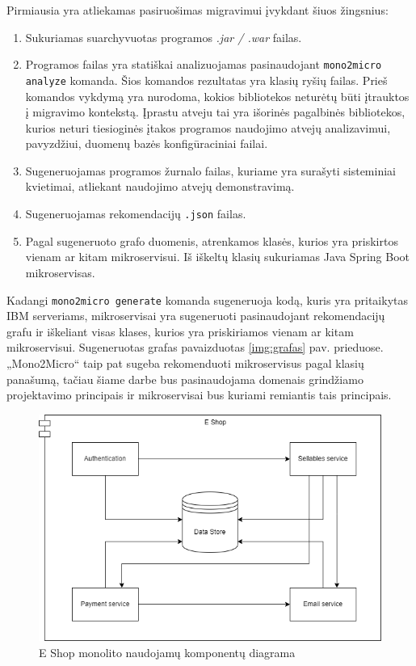 \documentclass{VUMIFPSbakalaurinis}
\begin{document}
Pirmiausia yra atliekamas pasiruošimas migravimui įvykdant šiuos žingsnius:
\begin{enumerate}
    \item Sukuriamas suarchyvuotas programos \emph{.jar / .war} failas. 

    \item Programos failas yra statiškai analizuojamas pasinaudojant \verb|mono2micro analyze| komanda. Šios komandos rezultatas yra klasių ryšių failas. Prieš komandos vykdymą yra nurodoma, kokios bibliotekos neturėtų būti įtrauktos į migravimo kontekstą. Įprastu atveju tai yra išorinės pagalbinės bibliotekos, kurios neturi tiesioginės įtakos programos naudojimo atvejų analizavimui, pavyzdžiui, duomenų bazės konfigūraciniai failai.

    \item Sugeneruojamas programos žurnalo failas, kuriame yra surašyti sisteminiai kvietimai, atliekant naudojimo atvejų demonstravimą.

    \item Sugeneruojamas rekomendacijų \verb|.json| failas.

    \item Pagal sugeneruoto grafo duomenis, atrenkamos klasės, kurios yra priskirtos vienam ar kitam mikroservisui. Iš iškeltų klasių sukuriamas Java Spring Boot mikroservisas.
    
\end{enumerate}

Kadangi \verb|mono2micro generate| komanda sugeneruoja kodą, kuris yra pritaikytas IBM serveriams, mikroservisai yra sugeneruoti pasinaudojant rekomendacijų grafu ir iškeliant visas klases, kurios yra priskiriamos vienam ar kitam mikroservisui. Sugeneruotas grafas pavaizduotas \ref{img:grafas} pav. prieduose. „Mono2Micro“ taip pat sugeba rekomenduoti mikroservisus pagal klasių panašumą, tačiau šiame darbe bus pasinaudojama domenais grindžiamo projektavimo principais ir mikroservisai bus kuriami remiantis tais principais.

\begin{figure}[H]
    \centering
    \includegraphics[scale=0.6]{img/komponentu diagrama.drawio.png}
    \caption{E Shop monolito naudojamų komponentų diagrama}
    \label{img:e-shop-komponentai}
\end{figure}
\end{document}

